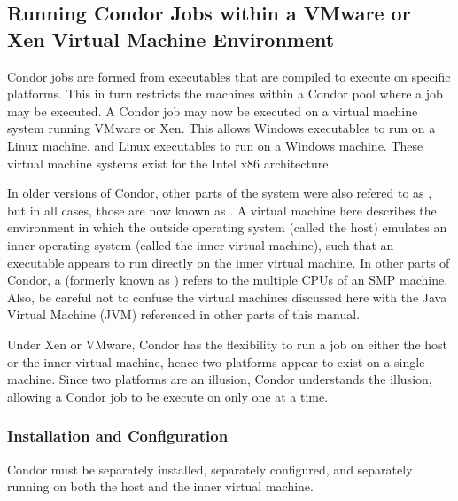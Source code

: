 \subsection{\label{sec:Virtual-Machines}
Running Condor Jobs within a VMware or Xen Virtual Machine Environment}

Condor jobs are formed from executables that are compiled to execute
on specific platforms.
This in turn restricts the machines within a Condor pool where
a job may be executed.
A Condor job may now be executed on a 
virtual machine system running VMware or Xen.
This allows Windows executables to run on a Linux machine,
and Linux executables to run on a Windows machine.
These virtual machine systems exist for the Intel x86 architecture.

In older versions of Condor, other parts of the system were also
refered to as , but in all cases, those are now
known as .
A virtual machine here describes the environment in which
the outside operating system (called the host) emulates an inner operating
system (called the inner virtual machine),
such that an executable appears to run directly
on the inner virtual machine.
In other parts of Condor, a  (formerly known as
) refers to the multiple CPUs of an SMP
machine.
Also, be careful not to confuse the virtual machines discussed here
with the Java Virtual Machine (JVM) referenced in other parts of this
manual.

Under Xen or VMware, 
Condor has the flexibility to run a job on either the host
or the inner virtual machine, 
hence two platforms appear to exist on a single machine.
Since two platforms are an illusion, Condor understands the illusion, 
allowing a Condor job to be execute on only
one at a time.

\subsubsection{\label{sec:Virtual-Machines-Configuration}
Installation and Configuration}

Condor must be separately installed, separately configured,
and separately running on both
the host and the inner virtual machine.

